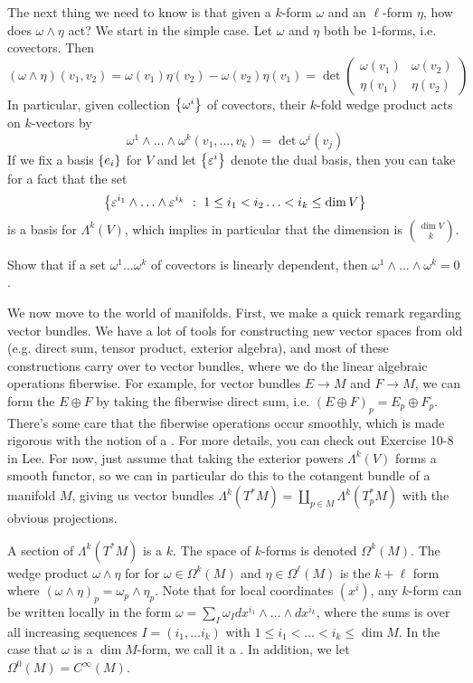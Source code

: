 The next thing we need to know is that given a $k$-form $\omega$ and
an $\ell$-form $\eta$, how does $\omega \wedge \eta$ act? We start in the simple
case. Let $\omega$ and $\eta$ both be $1$-forms, i.e. covectors. Then
$$(\omega \wedge \eta)(v_1,v_2) = \omega(v_1)\eta(v_2) - \omega(v_2)\eta(v_1)
= \det\begin{pmatrix}
  \omega(v_1) & \omega(v_2) \\
  \eta(v_1) & \eta(v_2)
\end{pmatrix}$$
In particular, given collection $\left\lbrace \omega^i \right\rbrace$ of covectors, their $k$-fold
wedge product acts on $k$-vectors by
$$\omega^1 \wedge \ldots \wedge \omega^k(v_1, \ldots ,v_k) = \det \omega^i(v_j)$$
If we fix a basis $\left\lbrace e_i \right\rbrace$ for $V$ and let $\left\lbrace \varepsilon^i \right\rbrace$ denote the
dual basis, then you can take for a fact that the set
$$\left\lbrace \varepsilon^{i_1} \wedge \ldots \wedge \varepsilon^{i_k}~:~
1 \leq i_1 < i_2 \ldots < i_k \leq \dim V \right\rbrace $$
is a basis for $\Lambda^k(V)$, which implies in particular that the dimension is
$\binom{\dim V}{k}$.
%
\begin{exer}
Show that if a set $\omega^1 \ldots \omega^k$ of covectors is linearly dependent,
then $\omega^1 \wedge \ldots \wedge \omega^k = 0$.
\end{exer}
%
We now move to the world of manifolds. First, we make a quick remark regarding
vector bundles. We have a lot of tools for constructing new vector spaces from
old (e.g. direct sum, tensor product, exterior algebra), and most of these
constructions carry over to vector bundles, where we do the linear algebraic
operations fiberwise. For example, for vector bundles $E \to M$ and $F \to M$,
we can form the  $E \oplus F$ by taking the fiberwise direct sum,
i.e. $(E \oplus F)_p = E_p \oplus F_p$. There's some care that the fiberwise
operations occur smoothly, which is made rigorous with the notion of a
. For more details, you can check out Exercise 10-8 in Lee.
For now, just assume that taking the exterior powers $\Lambda^k(V)$ forms
a smooth functor, so we can in particular do this to the cotangent bundle
of a manifold $M$, giving us vector bundles
$\Lambda^k(T^*M) = \coprod_{p \in M} \Lambda^k(T^*_pM)$ with the obvious
projections.
%
\begin{defn}
A section of $\Lambda^k(T^*M)$ is a  $k$. The space
of $k$-forms is denoted $\Omega^k(M)$. The wedge product $\omega \wedge \eta$
for for $\omega \in \Omega^k(M)$ and $\eta \in \Omega^\ell(M)$ is the $k+\ell$
form where $(\omega \wedge \eta)_p = \omega_p \wedge \eta_p$. Note that for local
coordinates $(x^i)$, any $k$-form can be written locally in the form
$\omega = \sum_I \omega_I dx^{i_1} \wedge \ldots \wedge dx^{i_k}$, where the
sums is over all increasing sequences $I = (i_1, \ldots i_k)$ with
$1 \leq i_1 < \ldots < i_k \leq \dim M$. In the case that $\omega$ is a
$\dim M$-form, we call it a . In addition, we let
$\Omega^0(M) = C^\infty(M)$.
\end{defn}
